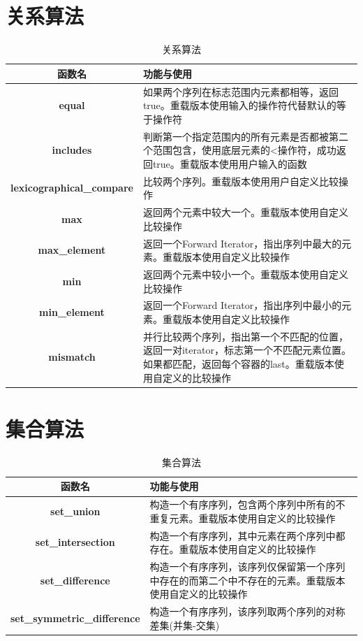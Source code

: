 \documentclass[UTF8,a4paper,12pt]{ctexbook}
\begin{document}
	\section{关系算法}	
	\begin{table}[H]
		\centering
		\caption{关系算法}
		\begin{tabular}{c|m{12cm}}
			\hline 
			函数名 & 功能与使用\\
			\hline
			\textbf{equal}	& 如果两个序列在标志范围内元素都相等，返回true。重载版本使用输入的操作符代替默认的等于操作符\\
			\hline 
			\textbf{includes}  & 判断第一个指定范围内的所有元素是否都被第二个范围包含，使用底层元素的<操作符，成功返回true。重载版本使用用户输入的函数\\
			\hline 
			\textbf{lexicographical\_compare}  & 比较两个序列。重载版本使用用户自定义比较操作\\
			\hline 
			\textbf{max}  & 返回两个元素中较大一个。重载版本使用自定义比较操作\\
			\hline 
			\textbf{max\_element} & 返回一个Forward Iterator，指出序列中最大的元素。重载版本使用自定义比较操作\\
			\hline 
			\textbf{min}	& 返回两个元素中较小一个。重载版本使用自定义比较操作\\
			\hline 
			\textbf{min\_element}	& 返回一个Forward Iterator，指出序列中最小的元素。重载版本使用自定义比较操作\\
			\hline 
			\textbf{mismatch}	& 并行比较两个序列，指出第一个不匹配的位置，返回一对iterator，标志第一个不匹配元素位置。如果都匹配，返回每个容器的last。重载版本使用自定义的比较操作\\
			\hline 
		\end{tabular}
	\end{table}
	
	\section{集合算法}
		\begin{table}[H]
			\centering
			\caption{集合算法}
			\begin{tabular}{c|m{12cm}}
				\hline 
				函数名 & 功能与使用\\
				\hline
				\textbf{set\_union}	& 构造一个有序序列，包含两个序列中所有的不重复元素。重载版本使用自定义的比较操作\\
				\hline 
				\textbf{set\_intersection}  & 构造一个有序序列，其中元素在两个序列中都存在。重载版本使用自定义的比较操作\\
				\hline 
				\textbf{set\_difference}  & 构造一个有序序列，该序列仅保留第一个序列中存在的而第二个中不存在的元素。重载版本使用自定义的比较操作\\
				\hline 
				\textbf{set\_symmetric\_difference}  & 构造一个有序序列，该序列取两个序列的对称差集(并集-交集)\\
				\hline 
			\end{tabular}
		\end{table}
	
\end{document}

